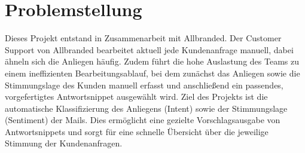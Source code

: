 \chapter{Problemstellung}

Dieses Projekt entstand in Zusammenarbeit mit Allbranded.
 Der Customer Support von Allbranded bearbeitet aktuell jede Kundenanfrage manuell,
  dabei ähneln sich die Anliegen häufig. Zudem führt die hohe Auslastung des Teams
   zu einem ineffizienten Bearbeitungsablauf, bei dem zunächst das Anliegen sowie die
    Stimmungslage des Kunden manuell erfasst und anschließend ein passendes, 
    vorgefertigtes Antwortsnippet ausgewählt wird. Ziel des Projekts ist die 
    automatische Klassifizierung des Anliegens (Intent) sowie der Stimmungslage 
    (Sentiment) der Mails. Dies ermöglicht eine gezielte Vorschlagsausgabe von
     Antwortsnippets und sorgt für eine schnelle Übersicht über die jeweilige 
     Stimmung der Kundenanfragen. 
